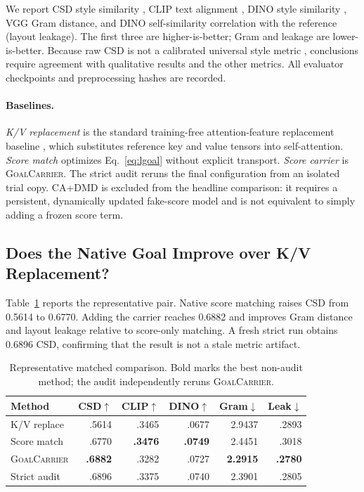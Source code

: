 \documentclass[10pt,letterpaper]{article}
\newcommand{\method}{\textsc{GoalCarrier}}
\begin{document}
We report CSD style similarity \cite{somepalli2024csd}, CLIP text alignment
\cite{radford2021clip}, DINO style similarity \cite{oquab2024dinov2}, VGG Gram
distance, and DINO self-similarity correlation with the reference (layout
leakage). The first three are higher-is-better; Gram and leakage are
lower-is-better. Because raw CSD is not a calibrated universal style metric
\cite{frochte2026csd}, conclusions require agreement with qualitative results
and the other metrics. All evaluator checkpoints and preprocessing hashes are
recorded.

\paragraph{Baselines.}
\emph{K/V replacement} is the standard training-free attention-feature
replacement baseline \cite{hertz2024stylealigned,chung2024styleinjection}, which
substitutes reference key and value tensors into self-attention.
\emph{Score match} optimizes Eq.~\ref{eq:lgoal} without explicit transport.
\emph{Score carrier} is \method. The strict audit reruns the final configuration
from an isolated trial copy. CA+DMD is excluded from the headline comparison:
it requires a persistent, dynamically updated fake-score model and is not
equivalent to simply adding a frozen score term.

\subsection{Does the Native Goal Improve over K/V Replacement?}

Table~\ref{tab:formal} reports the representative pair. Native score matching
raises CSD from 0.5614 to 0.6770. Adding the carrier reaches 0.6882 and improves
Gram distance and layout leakage relative to score-only matching. A fresh
strict run obtains 0.6896 CSD, confirming that the result is not a stale metric
artifact.

\begin{table}[t]
\centering
\caption{Representative matched comparison. Bold marks the best non-audit
method; the audit independently reruns \method.}
\label{tab:formal}
\small
\setlength{\tabcolsep}{3.2pt}
\begin{tabular}{lrrrrr}
\toprule
Method & CSD$\uparrow$ & CLIP$\uparrow$ & DINO$\uparrow$ & Gram$\downarrow$ & Leak$\downarrow$\\
\midrule
K/V replace & .5614 & .3465 & .0677 & 2.9437 & .2893\\
Score match & .6770 & \textbf{.3476} & \textbf{.0749} & 2.4451 & .3018\\
\method & \textbf{.6882} & .3282 & .0727 & \textbf{2.2915} & \textbf{.2780}\\
Strict audit & .6896 & .3375 & .0740 & 2.3901 & .2805\\
\bottomrule
\end{tabular}
\end{table}
\end{document}
